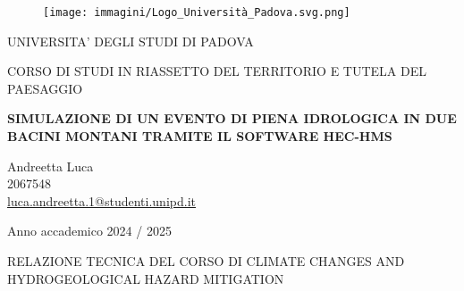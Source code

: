 \begin{figure}[H]\centering
    \texttt{[image: immagini/Logo\_Università\_Padova.svg.png]}
\end{figure}
\begin{center}

{\Large UNIVERSITA' DEGLI STUDI DI PADOVA }\\
  \vspace{0.4 cm}
  
{\Large CORSO DI STUDI IN RIASSETTO DEL TERRITORIO E TUTELA DEL PAESAGGIO } \\ 
    \vspace{0.4 cm}
    
    \vspace{1 cm}

{\huge \textbf{SIMULAZIONE DI UN EVENTO DI PIENA IDROLOGICA IN DUE BACINI MONTANI TRAMITE IL SOFTWARE HEC-HMS} }
\vspace{0.75 cm}

\normalsize
\end{center}

{\Large \begin{center}
Andreetta Luca \\
2067548 \\
\href{mailto:luca.andreetta.1@studenti.unipd.it}{luca.andreetta.1@studenti.unipd.it}
\end{center}
\vspace{1 cm}

\thispagestyle{empty}
\begin{center}
	Anno accademico 2024 / 2025
\end{center}

\vspace{2 cm}
\begin{center}
    RELAZIONE TECNICA DEL CORSO DI CLIMATE CHANGES AND HYDROGEOLOGICAL HAZARD MITIGATION 
\end{center}
}

\newpage